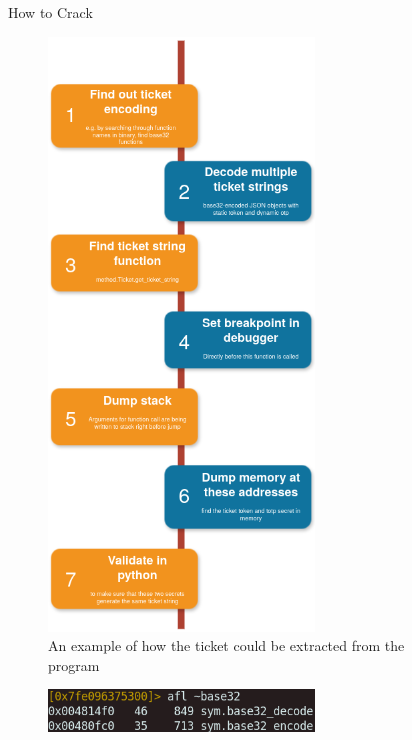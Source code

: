 \documentclass[final,dvipsnames]{beamer}
\newlength{\sepwidth}
\newlength{\colwidth}
\newcommand{\separatorcolumn}{\begin{column}{\sepwidth}\end{column}}
\begin{document}
\begin{frame}[t, fragile]
\begin{columns}[t]
\begin{column}{\colwidth}
\end{column}

\separatorcolumn

\begin{column}{\colwidth}
    \begin{block}{How to Crack}
        \begin{figure}[h]
            \centering
            \includegraphics[width=0.7\textwidth]{../figures/HackingFlow.png}
            \caption{An example of how the ticket could be extracted from the program}
            \label{fig:HackingFlow}
        \end{figure}
        \begin{figure}[h]
            \centering
            \includegraphics[width=0.7\textwidth]{../figures/Hacking_step_1.png}

\end{figure}
\end{block}
\end{column}
\end{columns}
\end{frame}
\end{document}
